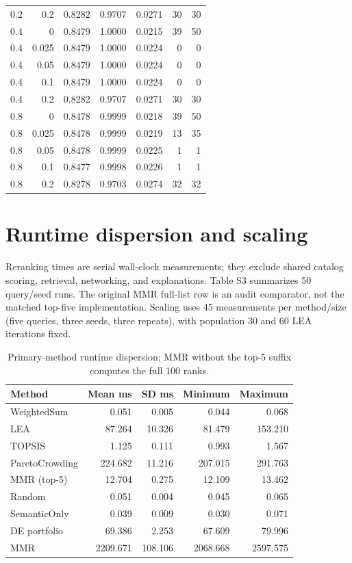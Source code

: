 \documentclass[11pt,a4paper]{article}
\begin{document}
\begin{footnotesize}
\begin{longtable}{rrrrrrr}
0.2 & 0.2 & 0.8282 & 0.9707 & 0.0271 & 30 & 30\\
0.4 & 0 & 0.8479 & 1.0000 & 0.0215 & 39 & 50\\
0.4 & 0.025 & 0.8479 & 1.0000 & 0.0224 & 0 & 0\\
0.4 & 0.05 & 0.8479 & 1.0000 & 0.0224 & 0 & 0\\
0.4 & 0.1 & 0.8479 & 1.0000 & 0.0224 & 0 & 0\\
0.4 & 0.2 & 0.8282 & 0.9707 & 0.0271 & 30 & 30\\
0.8 & 0 & 0.8478 & 0.9999 & 0.0218 & 39 & 50\\
0.8 & 0.025 & 0.8478 & 0.9999 & 0.0219 & 13 & 35\\
0.8 & 0.05 & 0.8478 & 0.9999 & 0.0225 & 1 & 1\\
0.8 & 0.1 & 0.8477 & 0.9998 & 0.0226 & 1 & 1\\
0.8 & 0.2 & 0.8278 & 0.9703 & 0.0274 & 32 & 32\\
\bottomrule\end{longtable}\end{footnotesize}
\section*{Runtime dispersion and scaling}
Reranking times are serial wall-clock measurements; they exclude shared catalog scoring, retrieval, networking, and explanations. Table S3 summarizes 50 query/seed runs. The original MMR full-list row is an audit comparator, not the matched top-five implementation. Scaling uses 45 measurements per method/size (five queries, three seeds, three repeats), with population 30 and 60 LEA iterations fixed.

\begin{table}[H]\centering\small
\caption{Primary-method runtime dispersion; MMR without the top-5 suffix computes the full 100 ranks.}
\begin{tabular}{lrrrr}
\toprule
Method & Mean ms & SD ms & Minimum & Maximum\\\midrule
WeightedSum & 0.051 & 0.005 & 0.044 & 0.068\\
LEA & 87.264 & 10.326 & 81.479 & 153.210\\
TOPSIS & 1.125 & 0.111 & 0.993 & 1.567\\
ParetoCrowding & 224.682 & 11.216 & 207.015 & 291.763\\
MMR (top-5) & 12.704 & 0.275 & 12.109 & 13.462\\
Random & 0.051 & 0.004 & 0.045 & 0.065\\
SemanticOnly & 0.039 & 0.009 & 0.030 & 0.071\\
DE portfolio & 69.386 & 2.253 & 67.609 & 79.996\\
MMR & 2209.671 & 108.106 & 2068.668 & 2597.575\\
\bottomrule\end{tabular}\end{table}
\end{document}
